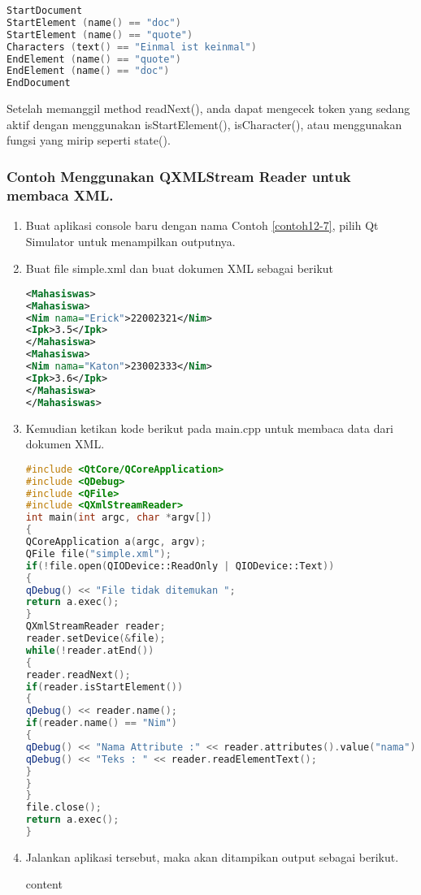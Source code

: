 \begin{lstlisting}[language=c++, numbers=none]
StartDocument
StartElement (name() == "doc")
StartElement (name() == "quote")
Characters (text() == "Einmal ist keinmal")
EndElement (name() == "quote")
EndElement (name() == "doc")
EndDocument
\end{lstlisting}

Setelah memanggil method readNext(), anda dapat mengecek token yang
sedang aktif dengan menggunakan isStartElement(), isCharacter(), atau
menggunakan fungsi yang mirip seperti state().

\subsubsection*{Contoh  Menggunakan QXMLStream Reader untuk membaca XML.}

\begin{enumerate}
\item
  Buat aplikasi console baru dengan nama Contoh \ref{contoh12-7}, pilih Qt Simulator
  untuk menampilkan outputnya.
\item
  Buat file simple.xml dan buat dokumen XML sebagai berikut

\begin{lstlisting}[language=xml]
<Mahasiswas>
<Mahasiswa>
<Nim nama="Erick">22002321</Nim>
<Ipk>3.5</Ipk>
</Mahasiswa>
<Mahasiswa>
<Nim nama="Katon">23002333</Nim>
<Ipk>3.6</Ipk>
</Mahasiswa>
</Mahasiswas>
\end{lstlisting}
\item
  Kemudian ketikan kode berikut pada main.cpp untuk membaca data dari
  dokumen XML.

\begin{lstlisting}[language=c++, caption=Menggunakan QXMLStream Reader untuk membaca XML, label=contoh12-7]
#include <QtCore/QCoreApplication>
#include <QDebug>
#include <QFile>
#include <QXmlStreamReader>
int main(int argc, char *argv[])
{
QCoreApplication a(argc, argv);
QFile file("simple.xml");
if(!file.open(QIODevice::ReadOnly | QIODevice::Text))
{
qDebug() << "File tidak ditemukan ";
return a.exec();
}
QXmlStreamReader reader;
reader.setDevice(&file);
while(!reader.atEnd())
{
reader.readNext();
if(reader.isStartElement())
{
qDebug() << reader.name();
if(reader.name() == "Nim")
{
qDebug() << "Nama Attribute :" << reader.attributes().value("nama");
qDebug() << "Teks : " << reader.readElementText();
}
}
}
file.close();
return a.exec();
}
\end{lstlisting}
\item
  Jalankan aplikasi tersebut, maka akan ditampikan output sebagai
  berikut.
  \begin{lcverbatim}
  	content
  \end{lcverbatim}
\end{enumerate}

